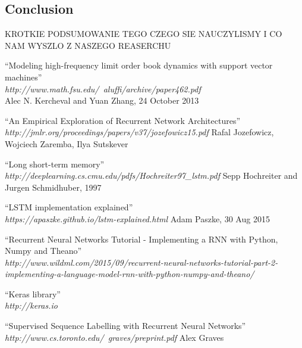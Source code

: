 \documentclass[twoside]{article}
\begin{document}
\begin{multicols}{2}
\section{Conclusion}

KROTKIE PODSUMOWANIE TEGO CZEGO SIE NAUCZYLISMY I CO NAM WYSZLO Z NASZEGO REASERCHU


\begin{thebibliography}{99}

    ``Modeling high-frequency limit order book dynamics with support vector machines'' \\
\emph{http://www.math.fsu.edu/~aluffi/archive/paper462.pdf} \\
	Alec N. Kercheval and Yuan Zhang, 24 October 2013

	``An Empirical Exploration of Recurrent Network Architectures'' \\
\emph{http://jmlr.org/proceedings/papers/v37/jozefowicz15.pdf}
	Rafal Jozefowicz, Wojciech Zaremba, Ilya Sutskever
	
	``Long short-term memory'' \\
\emph{http://deeplearning.cs.cmu.edu/pdfs/Hochreiter97\_lstm.pdf}
	Sepp Hochreiter and Jurgen Schmidhuber, 1997

    ``LSTM implementation explained'' \\
\emph{https://apaszke.github.io/lstm-explained.html} 
	Adam Paszke, 30 Aug 2015

    ``Recurrent Neural Networks Tutorial - Implementing a RNN with Python, Numpy and Theano'' \\ \emph{http://www.wildml.com/2015/09/recurrent-neural-networks-tutorial-part-2-implementing-a-language-model-rnn-with-python-numpy-and-theano/}

    ``Keras library'' \\
\emph{http://keras.io}

    ``Supervised Sequence Labelling with Recurrent Neural Networks''	\\	\emph{http://www.cs.toronto.edu/~graves/preprint.pdf} 
    Alex Graves

\end{thebibliography}


\end{multicols}
\end{document}
